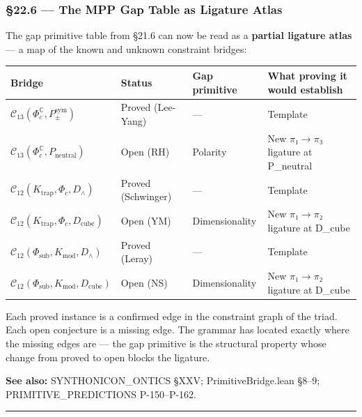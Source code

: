 \documentclass[12pt,a4paper]{article}
\newcommand{\pilcrow}{\S}
\begin{document}
\subsubsection{\pilcrow{}22.6 --- The MPP Gap Table as Ligature Atlas}

The gap primitive table from \pilcrow{}21.6 can now be read as a \textbf{partial ligature atlas} --- a map of the known and unknown constraint bridges:

\begin{table}[htbp]
\centering
\small
{}
\begin{tabularx}{\textwidth}{>{\centering\arraybackslash}X >{\centering\arraybackslash}X >{\centering\arraybackslash}X >{\centering\arraybackslash}X}
\toprule
\rowcolor{gray!25}\textbf{Bridge} & \textbf{Status} & \textbf{Gap primitive} & \textbf{What proving it would establish} \\
\midrule
\rowcolors{1}{white}{gray!10}
$\mathcal{C}_{13}(\Phi_c^{\mathbb{C}}, P_{\pm}^{\text{sym}})$ &  Proved (Lee-Yang) & --- & Template \\
$\mathcal{C}_{13}(\Phi_c^{\mathbb{C}}, P_\text{neutral})$ &  Open (RH) & Polarity & New $\pi$₁$\rightarrow$$\pi$₃ ligature at P\_neutral \\
$\mathcal{C}_{12}(K_\text{trap}, \Phi_c, D_{\wedge})$ &  Proved (Schwinger) & --- & Template \\
$\mathcal{C}_{12}(K_\text{trap}, \Phi_c, D_\text{cube})$ &  Open (YM) & Dimensionality & New $\pi$₁$\rightarrow$$\pi$₂ ligature at D\_cube \\
$\mathcal{C}_{12}(\Phi_\text{sub}, K_\text{mod}, D_{\wedge})$ &  Proved (Leray) & --- & Template \\
$\mathcal{C}_{12}(\Phi_\text{sub}, K_\text{mod}, D_\text{cube})$ &  Open (NS) & Dimensionality & New $\pi$₁$\rightarrow$$\pi$₂ ligature at D\_cube \\
\bottomrule
\end{tabularx}
\end{table}

Each proved instance is a confirmed edge in the constraint graph of the triad. Each open conjecture is a missing edge. The grammar has located exactly where the missing edges are --- the gap primitive is the structural property whose change from proved to open blocks the ligature.

\textbf{See also:} SYNTHONICON\_ONTICS \pilcrow{}XXV; PrimitiveBridge.lean \pilcrow{}8--9; PRIMITIVE\_PREDICTIONS P-150--P-162.

\begin{center}
\rule{0.5\textwidth}{0.4pt}
\end{center}
\end{document}

